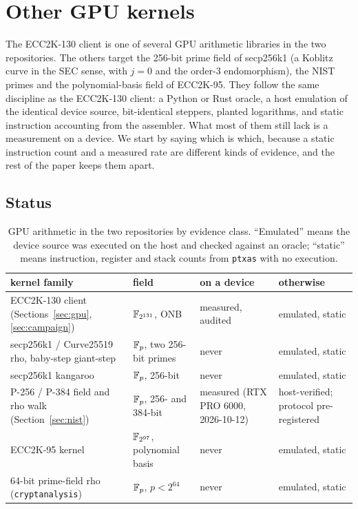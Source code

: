 \section{Other GPU kernels}
\label{sec:othergpu}

The ECC2K-130 client is one of several GPU arithmetic libraries in
the two repositories. The others target the 256-bit prime field of
secp256k1 (a Koblitz curve in the SEC sense, with $j=0$ and the
order-3 endomorphism), the NIST primes and the polynomial-basis field of
ECC2K-95. They follow the same discipline as the
ECC2K-130 client: a Python or Rust oracle, a host emulation of the
identical device source, bit-identical steppers, planted logarithms,
and static instruction accounting from the assembler. What most of
them still lack is a measurement on a device. We start by saying
which is which, because a static instruction count and a measured
rate are different kinds of evidence, and the rest of the paper keeps
them apart.

\subsection{Status}
\label{sec:othergpu-status}

\begin{table}[t]
\centering
\small
\caption{GPU arithmetic in the two repositories by evidence class.
  ``Emulated'' means the device source was executed on the host and
  checked against an oracle; ``static'' means instruction, register
  and stack counts from \texttt{ptxas} with no execution.}
\label{tab:gpu-status}
\begin{tabular}{@{}p{}p{}p{}p{}@{}}
\toprule
kernel family & field & on a device & otherwise \\
\midrule
ECC2K-130 client (Sections~\ref{sec:gpu}, \ref{sec:campaign}) & $\mathbb{F}_{2^{131}}$, ONB & measured, audited & emulated, static \\
secp256k1 / Curve25519 rho, baby-step giant-step & $\mathbb{F}_p$, two 256-bit primes & never & emulated, static \\
secp256k1 kangaroo & $\mathbb{F}_p$, 256-bit & never & emulated, static \\
P-256 / P-384 field and rho walk (Section~\ref{sec:nist}) & $\mathbb{F}_p$, 256- and 384-bit & measured (RTX PRO 6000, 2026-10-12) & host-verified; protocol pre-registered \\
ECC2K-95 kernel & $\mathbb{F}_{2^{97}}$, polynomial basis & never & emulated, static \\
64-bit prime-field rho (\texttt{cryptanalysis}) & $\mathbb{F}_p$, $p<2^{64}$ & never & emulated, static \\
\bottomrule
\end{tabular}
\end{table}

